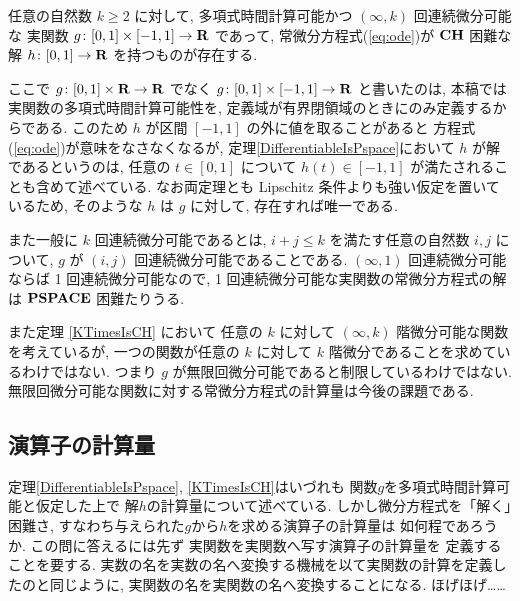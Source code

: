  \begin{theorem}
  \label{KTimesIsCH}
  任意の自然数 $k \ge 2$ に対して, 
  多項式時間計算可能かつ $(\infty, k)$ 回連続微分可能な
  実関数 $g \colon [0,1] \times [-1,1] \to \mathbf R$ であって, 
  常微分方程式(\ref{eq:ode})が
  $\mathbf{CH}$ 困難な解 $h \colon [0, 1] \to \mathbf R$ を持つものが存在する.
 \end{theorem}

ここで $g \colon [0,1] \times \mathbf R \to \mathbf R$ でなく
$g \colon [0,1] \times [-1, 1] \to \mathbf R$ と書いたのは, 
本稿では実関数の多項式時間計算可能性を, 
定義域が有界閉領域のときにのみ定義するからである. 
このため $h$ が区間 $[-1, 1]$ の外に値を取ることがあると
方程式(\ref{eq:ode})が意味をなさなくなるが, 
定理\ref{DifferentiableIsPspace}において $h$ が解であるというのは, 
任意の $t \in [0, 1]$ について $h (t) \in [-1, 1]$ が満たされることも含めて述べている.
なお両定理とも Lipschitz 条件よりも強い仮定を置いているため, 
そのような $h$ は $g$ に対して, 存在すれば唯一である. 

また一般に $k$ 回連続微分可能であるとは, 
$i+j \le k$ を満たす任意の自然数 $i,j$ について,
$g$ が $(i,j)$ 回連続微分可能であることである.
$(\infty, 1)$ 回連続微分可能ならば 1 回連続微分可能なので,
1 回連続微分可能な実関数の常微分方程式の解は $\mathbf{PSPACE}$ 困難たりうる.

 また定理 \ref{KTimesIsCH} において
 任意の $k$ に対して $(\infty, k)$ 階微分可能な関数を考えているが,
 一つの関数が任意の $k$ に対して $k$ 階微分であることを求めているわけではない.
 つまり $g$ が無限回微分可能であると制限しているわけではない. 
 無限回微分可能な関数に対する常微分方程式の計算量は今後の課題である.


\subsection{演算子の計算量}

定理\ref{DifferentiableIsPspace}, 
\ref{KTimesIsCH}はいづれも
関数$g$を多項式時間計算可能と仮定した上で
解$h$の計算量について述べている. 
しかし微分方程式を「解く」困難さ, 
すなわち与えられた$g$から$h$を求める演算子の計算量は
如何程であろうか. 
この問に答えるには先ず
実関数を実関数へ写す演算子の計算量を
定義することを要する. 
実数の名を実数の名へ変換する機械を以て実関数の計算を定義したのと同じように, 
実関数の名を実関数の名へ変換することになる. 
ほげほげ……

\newcommand{\OpDiffIVP}{\mathit{ODE}}
\newcommand{\deltabox}{\delta _\square}
\newcommand{\classtwofont}[1]{\text{\bfseries \sffamily \upshape #1}}
\newcommand{\classFPSPACEtwo}{\classtwofont{FPSPACE}}
\newcommand{\classCHtwo}{\classtwofont{CH}}
\newcommand{\redW}{\leq _{\mathrm W}}
\newcommand{\redSW}{\leq _{\mathrm{sW}}}

